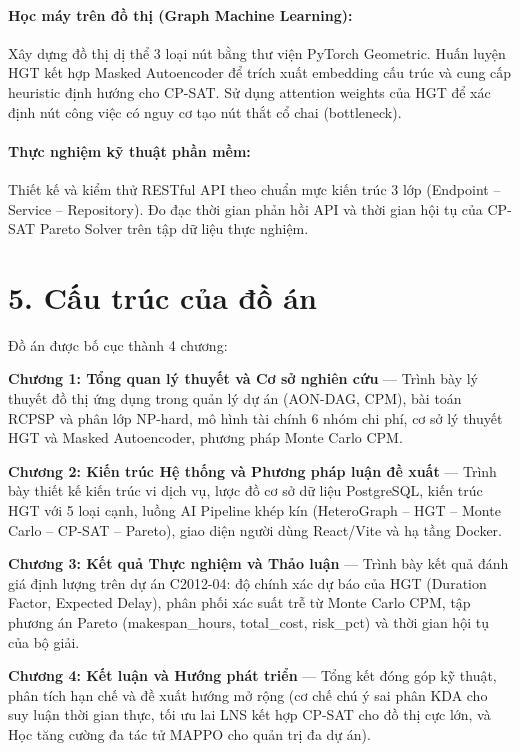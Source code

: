 \paragraph{Học máy trên đồ thị (Graph Machine Learning):} Xây dựng đồ thị dị thể 3 loại nút bằng thư viện PyTorch Geometric. Huấn luyện HGT kết hợp Masked Autoencoder để trích xuất embedding cấu trúc và cung cấp heuristic định hướng cho CP-SAT. Sử dụng attention weights của HGT để xác định nút công việc có nguy cơ tạo nút thắt cổ chai (bottleneck).

\paragraph{Thực nghiệm kỹ thuật phần mềm:} Thiết kế và kiểm thử RESTful API theo chuẩn mực kiến trúc 3 lớp (Endpoint -- Service -- Repository). Đo đạc thời gian phản hồi API và thời gian hội tụ của CP-SAT Pareto Solver trên tập dữ liệu thực nghiệm.

\section*{5. Cấu trúc của đồ án}

Đồ án được bố cục thành 4 chương:

\textbf{Chương 1: Tổng quan lý thuyết và Cơ sở nghiên cứu} --- Trình bày lý thuyết đồ thị ứng dụng trong quản lý dự án (AON-DAG, CPM), bài toán RCPSP và phân lớp NP-hard, mô hình tài chính 6 nhóm chi phí, cơ sở lý thuyết HGT và Masked Autoencoder, phương pháp Monte Carlo CPM.

\textbf{Chương 2: Kiến trúc Hệ thống và Phương pháp luận đề xuất} --- Trình bày thiết kế kiến trúc vi dịch vụ, lược đồ cơ sở dữ liệu PostgreSQL, kiến trúc HGT với 5 loại cạnh, luồng AI Pipeline khép kín (HeteroGraph -- HGT -- Monte Carlo -- CP-SAT -- Pareto), giao diện người dùng React/Vite và hạ tầng Docker.

\textbf{Chương 3: Kết quả Thực nghiệm và Thảo luận} --- Trình bày kết quả đánh giá định lượng trên dự án C2012-04: độ chính xác dự báo của HGT (Duration Factor, Expected Delay), phân phối xác suất trễ từ Monte Carlo CPM, tập phương án Pareto (makespan\_hours, total\_cost, risk\_pct) và thời gian hội tụ của bộ giải.

\textbf{Chương 4: Kết luận và Hướng phát triển} --- Tổng kết đóng góp kỹ thuật, phân tích hạn chế và đề xuất hướng mở rộng (cơ chế chú ý sai phân KDA cho suy luận thời gian thực, tối ưu lai LNS kết hợp CP-SAT cho đồ thị cực lớn, và Học tăng cường đa tác tử MAPPO cho quản trị đa dự án).